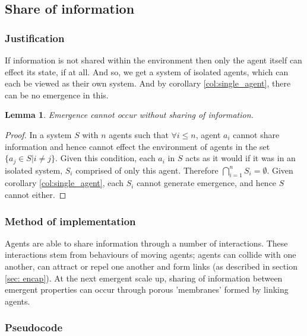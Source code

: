 \documentclass{article}
\newtheorem{lemma}[theorem]{Lemma}
\begin{document}
  \subsection{Share of information}
  
    \subsubsection{Justification}
      
   If information is not shared within the environment then only the agent itself can effect its state, if at all. And so, we get a system of isolated agents, which can each be viewed as their own system. And by corollary \ref{col:single_agent}, there can be no emergence in this.

      \begin{lemma}
        Emergence cannot occur without sharing of information.
      \end{lemma}
      \begin{proof}

       In a system $S$ with $n$ agents such that $\forall i \leq n$, agent $a_i$ cannot share information and hence cannot effect the environment of agents in the set $\{ a_j \in S | i \not = j \}$. Given this condition, each $a_i$ in $S$ acts as it would if it was in an isolated system, $S_i$ comprised of only this agent. Therefore $\bigcap_{i=1}^nS_i = \emptyset$. Given corollary \ref{col:single_agent}, each $S_i$ cannot generate emergence, and hence $S$ cannot either. 

      \end{proof}

    \subsubsection{Method of implementation}

      Agents are able to share information through a number of interactions. These interactions stem from behaviours of moving agents; agents can collide with one another, can attract or repel one another and form links (as described in section \ref{sec: encap}). At the next emergent scale up, sharing of information between emergent properties can occur through porous 'membranes' formed by linking agents.

    \subsubsection{Pseudocode}
      
\end{document}
